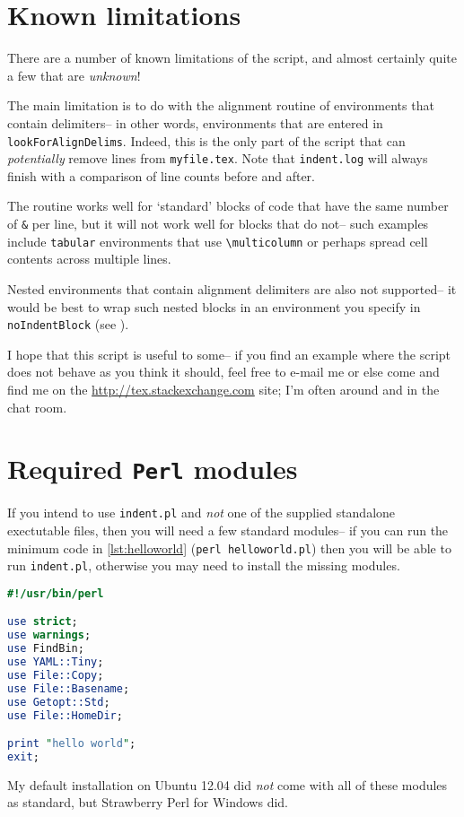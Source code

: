 \section{Known limitations}\label{sec:knownlimitations}
There are a number of known limitations of the script, and almost certainly quite a
few that are \emph{unknown}!
      
The main limitation is to do with the alignment routine of environments that contain 
delimiters-- in other words, environments that are entered in \lstinline!lookForAlignDelims!.
Indeed, this is the only part of the script that can \emph{potentially} remove 
lines from \lstinline!myfile.tex!. Note that \lstinline!indent.log! will always
finish with a comparison of line counts before and after. 
      
The routine works well for `standard' blocks of code that have the same number of \lstinline!&!
per line, but it will not work well for blocks that do not-- such examples 
include \lstinline!tabular! environments that use \lstinline!\multicolumn! or 
perhaps spread cell contents across multiple lines.
      
Nested environments that contain alignment delimiters are also not supported-- it 
would be best to wrap such nested blocks in an environment you specify in \lstinline!noIndentBlock! (see ).
      
I hope that this script is useful to some-- if you find an example where the 
script does not behave as you think it should, feel free to e-mail me or else
come and find me on the \url{http://tex.stackexchange.com} site; I'm often around 
and in the chat room.
      
\printbibliography[heading=bibintoc]

\appendix
\section{Required \lstinline!Perl! modules}\label{sec:requiredmodules}
If you intend to use \lstinline!indent.pl! and \emph{not} one of the supplied standalone exectutable files, then you will need a few standard modules-- if you can run the 
minimum code in \cref{lst:helloworld} (\lstinline!perl helloworld.pl!) then you will be able to run \lstinline!indent.pl!, otherwise you may 
need to install the missing modules.
 	 	 	 	 	
\begin{lstlisting}[language=Perl,caption={\lstinline!helloworld.pl!},label={lst:helloworld}]
#!/usr/bin/perl

use strict;
use warnings;           
use FindBin;            
use YAML::Tiny;         
use File::Copy;         
use File::Basename;     
use Getopt::Std;        
use File::HomeDir;      

print "hello world";
exit;
\end{lstlisting}
My default installation on Ubuntu 12.04 did \emph{not} come
with all of these modules as standard, but Strawberry Perl for Windows \cite{strawberryperl}
did.
	
